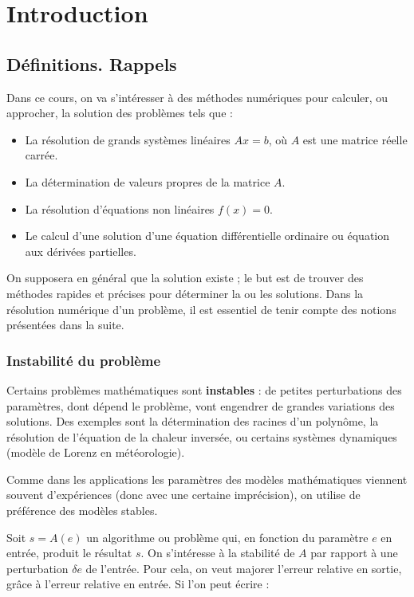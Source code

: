 \chapter{Introduction}

\section{Définitions. Rappels}

Dans ce cours, on va s’intéresser à des méthodes numériques pour calculer, ou approcher, la solution des problèmes tels que :

\begin{itemize}
\item La résolution de grands systèmes linéaires $Ax = b$, où $A$ est une matrice réelle carrée.
\item La détermination de valeurs propres de la matrice $A$.
\item La résolution d’équations non linéaires $f(x) = 0$.
\item Le calcul d’une solution d’une équation différentielle ordinaire ou équation aux dérivées partielles.
\end{itemize}

On supposera en général que la solution existe ; le but est de trouver des méthodes rapides et précises pour déterminer la ou les solutions. Dans la résolution numérique d’un problème, il est essentiel de tenir compte des notions présentées dans la suite.

\subsection{Instabilité du problème}
Certains problèmes mathématiques sont \textbf{instables} : de petites perturbations des paramètres, dont dépend le problème, vont engendrer de grandes variations des solutions. Des exemples sont la détermination des racines d’un polynôme, la résolution de l’équation de la chaleur inversée, ou certains systèmes dynamiques (modèle de Lorenz en météorologie).

Comme dans les applications les paramètres des modèles mathématiques viennent souvent d’expériences (donc avec une certaine imprécision), on utilise de préférence des modèles stables.

Soit $s = A(e)$ un algorithme ou problème qui, en fonction du paramètre $e$ en entrée, produit le résultat $s$. On s’intéresse à la stabilité de $A$ par rapport à une perturbation $\delta e$ de l’entrée. Pour cela, on veut majorer l’erreur relative en sortie, grâce à l’erreur relative en entrée. Si l’on peut écrire :

